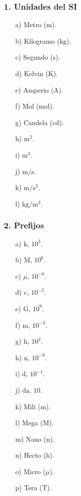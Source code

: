 \subsubsection*{1. Unidades del SI}
\begin{enumerate}
    \item[a)] Metro ($\mathrm{m}$).
    \item[b)] Kilogramo ($\mathrm{kg}$).
    \item[c)] Segundo ($\mathrm{s}$).
    \item[d)] Kelvin ($\mathrm{K}$).
    \item[e)] Amperio ($\mathrm{A}$).
    \item[f)] Mol ($\mathrm{mol}$).
    \item[g)] Candela ($\mathrm{cd}$).
    \item[h)] $\mathrm{m^2}$.
    \item[i)] $\mathrm{m^3}$.
    \item[j)] $\mathrm{m/s}$.
    \item[k)] $\mathrm{m/s^2}$.
    \item[l)] $\mathrm{kg/m^3}$.
\end{enumerate}

\subsubsection*{2. Prefijos}
\begin{enumerate}
    \item[a)] $\mathrm{k}$, $10^3$.
    \item[b)] $\mathrm{M}$, $10^6$.
    \item[c)] $\mu$, $10^{-6}$.
    \item[d)] $\mathrm{c}$, $10^{-2}$.
    \item[e)] $\mathrm{G}$, $10^9$.
    \item[f)] $\mathrm{m}$, $10^{-3}$.
    \item[g)] $\mathrm{h}$, $10^2$.
    \item[h)] $\mathrm{n}$, $10^{-9}$.
    \item[i)] $\mathrm{d}$, $10^{-1}$.
    \item[j)] $\mathrm{da}$, $10$.
    \item[k)] Mili ($\mathrm{m}$).
    \item[l)] Mega ($\mathrm{M}$).
    \item[m)] Nano ($\mathrm{n}$).
    \item[n)] Hecto ($\mathrm{h}$).
    \item[o)] Micro ($\mu$).
    \item[p)] Tera ($\mathrm{T}$).
\end{enumerate}

